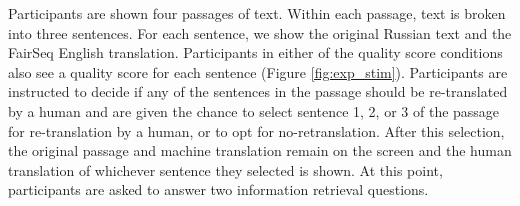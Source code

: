 \begin{table}[h!]
\caption{N for each condition. }
\label{tab:exp_N}
\end{table}

Participants are shown four passages of text. Within each passage, text is broken into three sentences. For each sentence, we show the original Russian text and the FairSeq English translation. Participants in either of the quality score conditions also see a quality score for each sentence (Figure \ref{fig:exp_stim}). Participants are instructed to decide if any of the sentences in the passage should be re-translated by a human and are given the chance to select sentence 1, 2, or 3 of the passage for re-translation by a human, or to opt for no-retranslation. After this selection, the original passage and machine translation remain on the screen and the human translation of whichever sentence they selected is shown. At this point, participants are asked to answer two information retrieval questions. 


